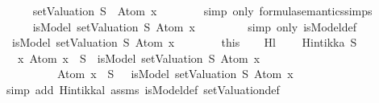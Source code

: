 \begin{isabellebody}
\ \isamarkupfalse%
\ {\isachardoublequoteopen}{\isasymdots}\ {\isacharequal}\ {\isacharparenleft}{\isasymnot}\ {\isacharparenleft}{\isacharparenleft}setValuation\ S{\isacharparenright}\ {\isasymTurnstile}\ {\isacharparenleft}Atom\ x{\isacharparenright}{\isacharparenright}{\isacharparenright}{\isachardoublequoteclose}\isanewline
\ \ \ \ \ \ \isamarkupfalse%
\ {\isacharparenleft}simp\ only{\isacharcolon}\ formula{\isacharunderscore}semantics{\isachardot}simps{\isacharparenleft}{}{\isacharparenright}{\isacharparenright}\isanewline
\ \ \ \ \isamarkupfalse%
\ \isamarkupfalse%
\ {\isachardoublequoteopen}{\isasymdots}\ {\isacharequal}\ {\isacharparenleft}{\isasymnot}\ isModel\ {\isacharparenleft}setValuation\ S{\isacharparenright}\ {\isacharparenleft}Atom\ x{\isacharparenright}{\isacharparenright}{\isachardoublequoteclose}\ \isanewline
\ \ \ \ \ \ \isamarkupfalse%
\ {\isacharparenleft}simp\ only{\isacharcolon}\ isModel{\isacharunderscore}def{\isacharparenright}\isanewline
\ \ \ \ \isamarkupfalse%
\ \isamarkupfalse%
\ {\isachardoublequoteopen}{\isasymnot}\ isModel\ {\isacharparenleft}setValuation\ S{\isacharparenright}\ {\isacharparenleft}Atom\ x{\isacharparenright}{\isachardoublequoteclose}\isanewline
\ \ \ \ \ \ \isamarkupfalse%
\ this\isanewline
\ \ \isamarkupfalse%
\isanewline
{}\isamarkupfalse%
%
\endisatagproof
{\isafoldproof}%
%
\isadelimproof
\isanewline
%
\endisadelimproof
\isanewline
{}\isamarkupfalse%
\ Hl{}{\isacharunderscore}{}{\isacharcolon}\isanewline
\ \ \ \ {\isachardoublequoteopen}Hintikka\ S{\isachardoublequoteclose}\isanewline
\ \ \ {\isachardoublequoteopen}{\isasymAnd}x{\isachardot}\ {\isacharparenleft}Atom\ x\ {\isasymin}\ S\ {\isasymlongrightarrow}\ isModel\ {\isacharparenleft}setValuation\ S{\isacharparenright}\ {\isacharparenleft}Atom\ x{\isacharparenright}{\isacharparenright}\ {\isasymand}\isanewline
\ \ \ \ \ \ \ \ \ {\isacharparenleft}\isactrlbold {\isasymnot}\ {\isacharparenleft}Atom\ x{\isacharparenright}\ {\isasymin}\ S\ {\isasymlongrightarrow}\ {\isasymnot}\ isModel\ {\isacharparenleft}setValuation\ S{\isacharparenright}\ {\isacharparenleft}Atom\ x{\isacharparenright}{\isacharparenright}{\isachardoublequoteclose}\isanewline
%
\isadelimproof
\ \ %
\endisadelimproof
%
\isatagproof
{}\isamarkupfalse%
\ {\isacharparenleft}simp\ add{\isacharcolon}\ Hintikka{\isacharunderscore}l{}{}\ assms\ isModel{\isacharunderscore}def\ setValuation{\isacharunderscore}def{\isacharparenright}%

\end{isabellebody}

